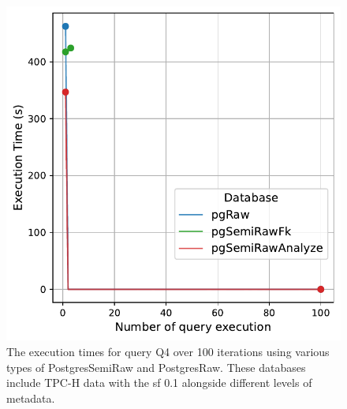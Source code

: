\begin{figure}[hbt!]
\centering
\includegraphics[width=1.0\linewidth]{charts-eval-exp-time-stat/execution_time_db_type_Q4.pdf}
\caption[Q4:result]{The execution times for query Q4 over 100 iterations using various types of PostgresSemiRaw and PostgresRaw. These databases include TPC-H data with the \acrshort{sf} 0.1 alongside different levels of metadata.}
\label{fig:execution_time_db_type_Q4}
\end{figure}
